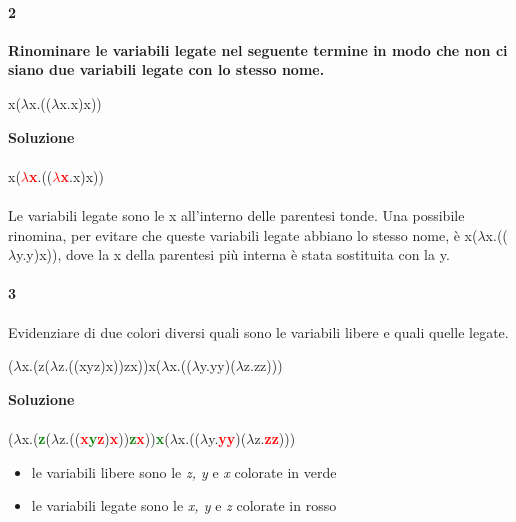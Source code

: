 \documentclass[10pt,a4paper, italian]{book}
\begin{document}
\paragraph{2}
\textbf{Rinominare le variabili legate nel seguente termine in modo che non ci siano due variabili legate con lo stesso nome.}
\begin{center}x($\lambda$x.(($\lambda$x.x)x))\end{center}
\textbf{Soluzione}\\\\
x(\textbf{\textcolor{red}{$\lambda$x}}.((\textbf{\textcolor{red}{$\lambda$x}}.x)x))\\\\
Le variabili legate sono le x all'interno delle parentesi tonde. Una possibile rinomina, per evitare che queste variabili legate abbiano lo stesso nome, \`e x($\lambda$x.(($\lambda$y.y)x)), dove la x della parentesi pi\`u interna \`e stata sostituita con la y.

\paragraph{3}
Evidenziare di due colori diversi quali sono le variabili libere e quali quelle legate.
\begin{center}($\lambda$x.(z($\lambda$z.((xyz)x))zx))x($\lambda$x.(($\lambda$y.yy)($\lambda$z.zz)))\end{center}
\textbf{Soluzione}\\\\
($\lambda$x.(\textbf{\textcolor{green}{z}}($\lambda$z.((\textbf{\textcolor{red}{x}\textcolor{green}{y}\textcolor{red}{z}})\textbf{\textcolor{red}{x}}))\textbf{\textcolor{green}{z}\textcolor{red}{x}}))\textbf{\textcolor{green}{x}}($\lambda$x.(($\lambda$y.\textbf{\textcolor{red}{yy}})($\lambda$z.\textbf{\textcolor{red}{zz}})))
\begin{itemize}
\item le variabili libere sono le \textit{z, y} e \textit{x} colorate in verde
\item le variabili legate sono le \textit{x, y} e \textit{z} colorate in rosso
\end{itemize}
\end{document}
